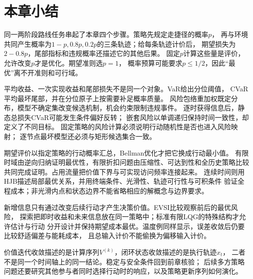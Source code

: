 \section{本章小结}
\label{sec:decision-theory-and-dynamic-risk-summary}

同一两阶段路线任务串起了本章四个步骤。策略先规定走捷径的概率$p$，
再与环境共同产生概率为$1-p,0.8p,0.2p$的三条轨迹；给每条轨迹计价后，
期望损失为$2-0.8p$，尾部指标和违规概率还描述它的其他后果。
固定$p$计算这些量是评价，允许改变$p$才是优化。期望准则选$p=1$，
概率预算可能要求$p\leq1/2$，因此“最优”离不开准则和可行域。

平均收益、一次实现收益和尾部损失不是同一个对象。VaR给出分位阈值，
CVaR平均最坏尾部，并在分位原子上按需要补足概率质量。
风险包络重加权既定分布，模型不确定集改变候选机制，机会约束限制违规事件。
逐时获得信息后，静态总损失CVaR可能发生条件偏好反转；
嵌套风险以单调递归保持时间一致性，却定义了不同目标。
固定策略的风险计算必须说明行动随机性是否也进入风险映射；
逐节点最坏模型还必须与矩形候选集合一致。

期望评价以指定策略的行动概率汇总，Bellman优化才把它换成行动最小值。
有限时域由逆向归纳证明最优性，有限折扣问题由压缩性、可达到性和全历史策略比较
共同完成证明。占用流量把价值下界与可实现访问频率连接起来。
连续时间则用HJB描述局部最优关系，并用终端条件、光滑性、轨迹可行性与可积条件
验证全程成本；非光滑内点和状态边界不能省略相应的解概念与边界要求。

新增信息只有通过改变后续行动才产生决策价值。EVSI比较观察前后的最优风险，
探索把即时收益和未来信息放在同一策略中；标准有限LQG的特殊结构才允许估计与行动
分开设计并保持期望成本最优。温度例同样显示，误差收敛后仍要比较舒适偏差与能耗成本，
且总输入计价不能偷换为偏移输入计价。

价值迭代收敛描述的是计算序列$V^{(k)}$，闭环状态收敛描述的是执行轨迹$x_t$，
二者不是同一个时间轴上的同一结论。稳定与安全条件回到前章核验；
后续多方策略问题还要研究其他参与者同时选择行动时的响应，以及策略更新序列如何演化。
